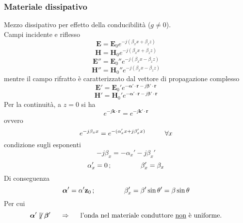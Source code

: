 \documentclass[a4paper]{article}
\begin{document}
\subsubsection*{Materiale dissipativo}
Mezzo dissipativo per effetto della conducibilità ($g\neq0$).\\
Campi incidente e riflesso
\begin{equation*}
\textbf{E}=\textbf{E}_0e^{-j(\beta_xx+\beta_zz)}
\end{equation*}
\begin{equation*}
\textbf{H}=\textbf{H}_0e^{-j(\beta_xx+\beta_zz)}
\end{equation*}
\begin{equation*}
\textbf{E}''=\textbf{E}_0''e^{-j(\beta_xx-\beta_zz)}
\end{equation*}
\begin{equation*}
\textbf{H}''=\textbf{H}_0''e^{-j(\beta_xx-\beta_zz)}
\end{equation*}
mentre il campo rifratto è caratterizzato dal vettore di propagazione complesso
\begin{equation*}
\textbf{E}'=\textbf{E}_0'e^{-\bm{\alpha}'\cdot\textbf{r}-j\bm{\beta}'\cdot\textbf{r}}
\end{equation*}
\begin{equation*}
\textbf{H}'=\textbf{H}_0'e^{-\bm{\alpha}'\cdot\textbf{r}-j\bm{\beta}'\cdot\textbf{r}}
\end{equation*}
Per la continuità, a $z=0$ si ha
\begin{equation*}
e^{-j\textbf{k}\cdot\textbf{r}}=e^{-j\textbf{k}'\cdot\textbf{r}}
\end{equation*}
ovvero
\begin{equation*}
e^{-j\beta_xx}=e^{-(\alpha_x'x+j\beta_x'x)}\hspace{10mm}\forall x
\end{equation*}
condizione sugli esponenti
\begin{equation*}
-j\beta_x=-\alpha_x'-j\beta_x'
\end{equation*}
\begin{equation*}
\alpha_x'=0\,;\hspace{15mm}\beta_x'=\beta_x
\end{equation*}
Di conseguenza
\begin{equation*}
\bm{\alpha}'=\alpha'\textbf{z}_0\,;\hspace{15mm}\beta_x'=\beta'\sin\theta'=\beta\sin\theta
\end{equation*}
Per cui
\begin{equation*}
\bm{\alpha}'\not\parallel\bm{\beta}'\hspace{5mm}\Rightarrow\hspace{5mm}\text{l'onda nel materiale conduttore \underline{non} è uniforme.}
\end{equation*}

\end{document}
